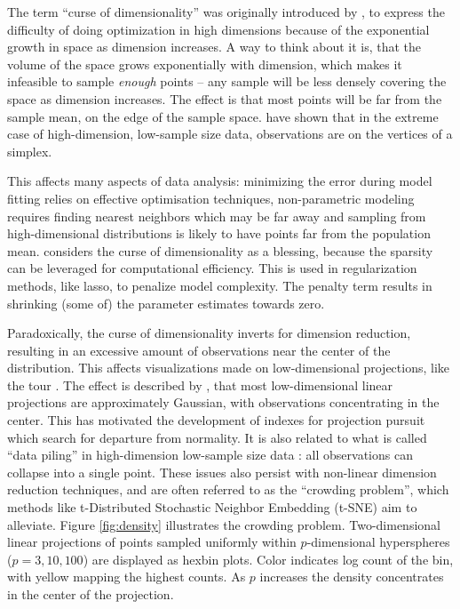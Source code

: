 \documentclass[]{interact}
\theoremstyle{plain}%
\theoremstyle{definition}
\theoremstyle{remark}
\begin{document}
The term ``curse of dimensionality'' was originally introduced by
\citet{BellmanRichard1961}, to express the difficulty of doing
optimization in high dimensions because of the exponential growth in
space as dimension increases. A way to think about it is, that the
volume of the space grows exponentially with dimension, which makes it
infeasible to sample \emph{enough} points -- any sample will be less
densely covering the space as dimension increases. The effect is that
most points will be far from the sample mean, on the edge of the sample
space. \citet{doi:10.1111/j.1467-9868.2005.00510.x} have shown that in
the extreme case of high-dimension, low-sample size data, observations
are on the vertices of a simplex.

This affects many aspects of data analysis: minimizing the error during
model fitting relies on effective optimisation techniques,
non-parametric modeling requires finding nearest neighbors which may be
far away and sampling from high-dimensional distributions is likely to
have points far from the population mean. \citet{Donoho00} considers the
curse of dimensionality as a blessing, because the sparsity can be
leveraged for computational efficiency. This is used in regularization
methods, like lasso, to penalize model complexity. The penalty term
results in shrinking (some of) the parameter estimates towards zero.

Paradoxically, the curse of dimensionality inverts for dimension
reduction, resulting in an excessive amount of observations near the
center of the distribution. This affects visualizations made on
low-dimensional projections, like the tour \citep[\citet{BCAH05}]{As85}.
The effect is described by \citet{diaconis1984}, that most
low-dimensional linear projections are approximately Gaussian, with
observations concentrating in the center. This has motivated the
development of indexes for projection pursuit which search for departure
from normality. It is also related to what is called ``data piling'' in
high-dimension low-sample size data
\citep[\citet{10.1093/biomet/asp084}]{10.2307/27639976}: all
observations can collapse into a single point. These issues also persist
with non-linear dimension reduction techniques, and are often referred
to as the ``crowding problem'', which methods like t-Distributed
Stochastic Neighbor Embedding (t-SNE) \citep{tsne} aim to alleviate.
Figure \ref{fig:density} illustrates the crowding problem.
Two-dimensional linear projections of points sampled uniformly within
\(p\)-dimensional hyperspheres (\(p=3, 10, 100\)) are displayed as
hexbin plots. Color indicates log count of the bin, with yellow mapping
the highest counts. As \(p\) increases the density concentrates in the
center of the projection.
\end{document}
